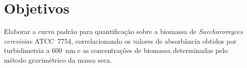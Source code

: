 
\section{Objetivos}

Elaborar a curva padrão para quantificação sobre a biomassa de \textit{Saccharomyces cerevisiae} ATCC~7754, correlacionando os valores de absorbância obtidos por turbidimetria a 600~nm e as concentrações de biomassa determinadas pelo método gravimétrico da massa seca.